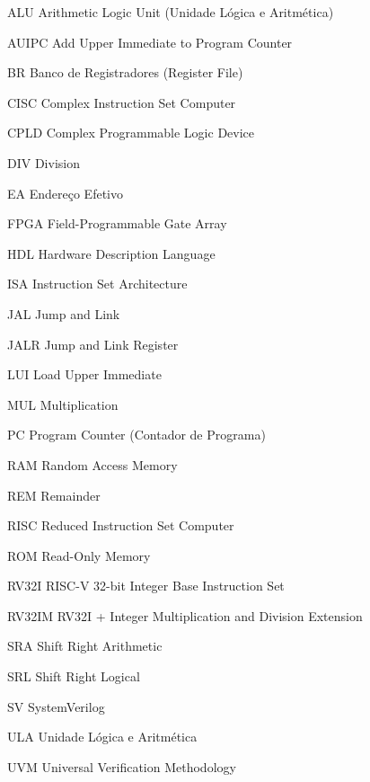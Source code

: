 \documentclass[
	12pt,				%
	oneside,
	a4paper,			%
	english,			%
	french,				%
	spanish,			%
	brazil,				%
	]{abntex2}
\begin{document}
\begin{siglas}
  \item[ALU] Arithmetic Logic Unit (Unidade Lógica e Aritmética)
  \item[AUIPC] Add Upper Immediate to Program Counter
  \item[BR] Banco de Registradores (Register File)
  \item[CISC] Complex Instruction Set Computer
  \item[CPLD] Complex Programmable Logic Device
  \item[DIV] Division
  \item[EA] Endereço Efetivo
  \item[FPGA] Field-Programmable Gate Array
  \item[HDL] Hardware Description Language
  \item[ISA] Instruction Set Architecture
  \item[JAL] Jump and Link
  \item[JALR] Jump and Link Register
  \item[LUI] Load Upper Immediate
  \item[MUL] Multiplication
  \item[PC] Program Counter (Contador de Programa)
  \item[RAM] Random Access Memory
  \item[REM] Remainder
  \item[RISC] Reduced Instruction Set Computer
  \item[ROM] Read-Only Memory
  \item[RV32I] RISC-V 32-bit Integer Base Instruction Set
  \item[RV32IM] RV32I + Integer Multiplication and Division Extension
  \item[SRA] Shift Right Arithmetic
  \item[SRL] Shift Right Logical
  \item[SV] SystemVerilog
  \item[ULA] Unidade Lógica e Aritmética
  \item[UVM] Universal Verification Methodology
\end{siglas}


\listoffigures*
\clearpage

\listoftables*
\clearpage

\tableofcontents*
\end{document}
